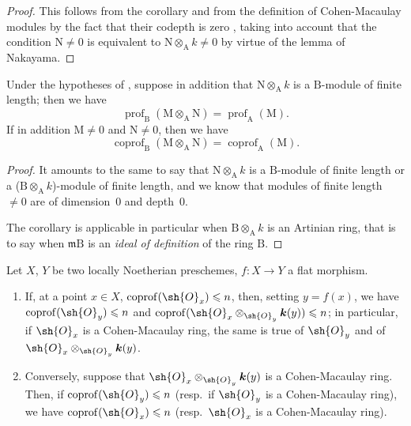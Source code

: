 \begin{proof}
This follows from the corollary  and from the definition of Cohen-Macaulay modules by the fact that their codepth is zero , taking into account that the condition $\mathrm{N}\neq 0$ is equivalent to $\mathrm{N}\otimes_\mathrm{A} k\neq 0$ by virtue of the lemma of Nakayama.
\end{proof}

\begin{corollary}[6.3.4]
\label{IV.6.3.4}
Under the hypotheses of , suppose in addition that $\mathrm{N}\otimes_\mathrm{A} k$ is a $\mathrm{B}$-module of finite length; then we have
\begin{equation}
  \operatorname{prof}_\mathrm{B}(\mathrm{M}\otimes_\mathrm{A}\mathrm{N})=\operatorname{prof}_\mathrm{A}(\mathrm{M}).
  \label{IV.6.3.4.1}
\tag{6.3.4.1}
\end{equation}
If in addition $\mathrm{M}\neq 0$ and $\mathrm{N}\neq 0$, then we have
\begin{equation}
  \operatorname{coprof}_\mathrm{B}(\mathrm{M}\otimes_\mathrm{A}\mathrm{N})=\operatorname{coprof}_\mathrm{A}(\mathrm{M}).
  \label{IV.6.3.4.2}
\tag{6.3.4.2}
\end{equation}
\end{corollary}

\begin{proof}
It amounts to the same to say that $\mathrm{N}\otimes_\mathrm{A} k$ is a $\mathrm{B}$-module of finite length or a ($\mathrm{B}\otimes_\mathrm{A} k$)-module of finite length, and we know  that modules of finite length $\neq 0$ are of dimension~$0$ and depth~$0$.

The corollary  is applicable in particular when $\mathrm{B}\otimes_\mathrm{A} k$ is an Artinian ring, that is to say when $\mathfrak{m}\mathrm{B}$ is an \emph{ideal of definition} of the ring $\mathrm{B}$.
\end{proof}

\begin{corollary}[6.3.5]
\label{IV.6.3.5}
Let $X$, $Y$ be two locally Noetherian preschemes, $f:X\to Y$ a flat morphism.
\begin{enumerate}[label=(\roman*)]
  \item If, at a point $x\in X$, $\operatorname{coprof}(\sh{O}_x)\leqslant n$, then, setting $y=f(x)$, we have $\operatorname{coprof}(\sh{O}_y)\leqslant n$ and $\operatorname{coprof}(\sh{O}_x\otimes_{\sh{O}_y}\boldsymbol{k}(y))\leqslant n$; in particular, if $\sh{O}_x$ is a Cohen-Macaulay ring, the same is true of $\sh{O}_y$ and of $\sh{O}_x\otimes_{\sh{O}_y}\boldsymbol{k}(y)$.
  \item Conversely, suppose that $\sh{O}_x\otimes_{\sh{O}_y}\boldsymbol{k}(y)$ is a Cohen-Macaulay ring.
Then, if $\operatorname{coprof}(\sh{O}_y)\leqslant n$ \textnormal{(}resp.\ if $\sh{O}_y$ is a Cohen-Macaulay ring\textnormal{)}, we have $\operatorname{coprof}(\sh{O}_x)\leqslant n$ \textnormal{(}resp.\ $\sh{O}_x$ is a Cohen-Macaulay ring\textnormal{)}.
\end{enumerate}
\end{corollary}


